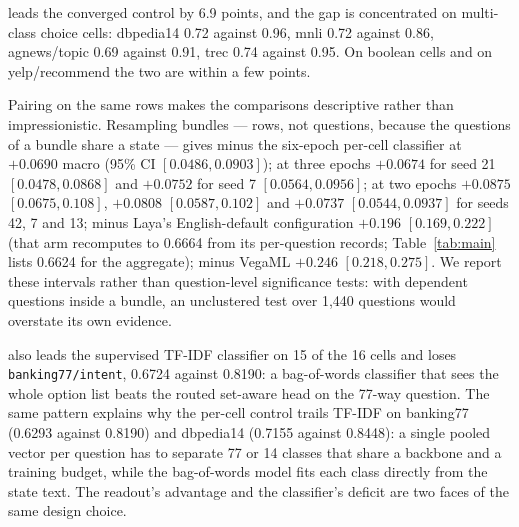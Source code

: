 \vsix{} leads the converged control by 6.9 points, and the gap is concentrated on multi-class choice
cells: dbpedia14 0.72 against 0.96, mnli 0.72 against 0.86, agnews/topic 0.69 against 0.91, trec
0.74 against 0.95. On boolean cells and on yelp/recommend the two are within a few points.

Pairing on the same rows makes the comparisons descriptive rather than impressionistic. Resampling
bundles --- rows, not questions, because the questions of a bundle share a state --- gives \vsix{}
minus the six-epoch per-cell classifier at $+0.0690$ macro (95\% CI $[0.0486,0.0903]$); at three
epochs $+0.0674$ for seed 21 $[0.0478,0.0868]$ and $+0.0752$ for seed 7 $[0.0564,0.0956]$; at two
epochs $+0.0875$ $[0.0675,0.108]$, $+0.0808$ $[0.0587,0.102]$ and $+0.0737$ $[0.0544,0.0937]$ for
seeds 42, 7 and 13; minus Laya's English-default configuration $+0.196$ $[0.169,0.222]$ (that arm recomputes to
0.6664 from its per-question records; Table~\ref{tab:main} lists 0.6624 for the aggregate);
minus VegaML $+0.246$ $[0.218,0.275]$. We report these intervals rather than question-level
significance tests: with dependent questions inside a bundle, an unclustered test over 1{,}440
questions would overstate its own evidence.

\vsix{} also leads the supervised TF-IDF classifier on 15 of the 16 cells and loses
\texttt{banking77/intent}, 0.6724 against 0.8190: a bag-of-words classifier that sees the whole
option list beats the routed set-aware head on the 77-way question. The same pattern explains why the
per-cell control trails TF-IDF on banking77 (0.6293 against 0.8190) and dbpedia14 (0.7155 against
0.8448): a single pooled vector per question has to separate 77 or 14 classes that share a
backbone and a training budget, while the bag-of-words model fits each class directly from the state
text. The readout's advantage and the classifier's deficit are two faces of the same design choice.

